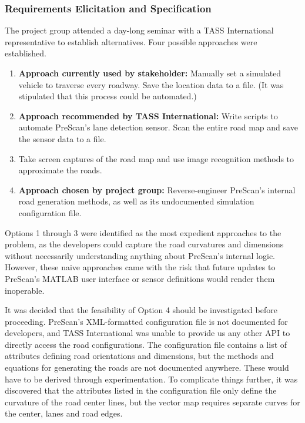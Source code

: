 \documentclass[12pt,twoside]{article}
\begin{document}
\subsubsection{Requirements Elicitation and Specification}
The project group attended a day-long seminar with a TASS International representative to establish alternatives. Four possible approaches were established.
\begin{enumerate}
  \item \textbf{Approach currently used by stakeholder:} Manually set a simulated vehicle to traverse every roadway. Save the location data to a file. (It was stipulated that this process could be automated.)
  \item \textbf{Approach recommended by TASS International:} Write scripts to automate PreScan's lane detection sensor. Scan the entire road map and save the sensor data to a file.
  \item Take screen captures of the road map and use image recognition methods to approximate the roads.
  \item \textbf{Approach chosen by project group:} Reverse-engineer PreScan’s internal road generation methods, as well as its undocumented simulation configuration file.
\end{enumerate}
Options 1 through 3 were identified as the most expedient approaches to the problem, as the developers could capture the road curvatures and dimensions without necessarily understanding anything about PreScan's internal logic. However, these naive approaches came with the risk that future updates to PreScan's MATLAB user interface or sensor definitions would render them inoperable.

It was decided that the feasibility of Option 4 should be investigated before proceeding. PreScan's XML-formatted configuration file is not documented for developers, and TASS International was unable to provide us any other API to directly access the road configurations. The configuration file contains a list of attributes defining road orientations and dimensions, but the methods and equations for generating the roads are not documented anywhere. These would have to be derived through experimentation. To complicate things further, it was discovered that the attributes listed in the configuration file only define the curvature of the road center lines, but the vector map requires separate curves for the center, lanes and road edges.
\end{document}
